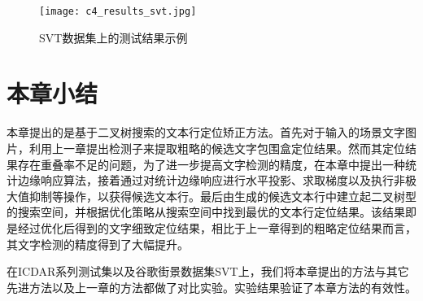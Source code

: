         \begin{figure}[!h]
        \centering
        \texttt{[image: c4\_results\_svt.jpg]}
        \caption{SVT数据集上的测试结果示例}
        \label{fig.c4_results_svt}
        \end{figure}


    \section{本章小结}

    本章提出的是基于二叉树搜索的文本行定位矫正方法。首先对于输入的场景文字图片，利用上一章提出检测子来提取粗略的候选文字包围盒定位结果。然而其定位结果存在重叠率不足的问题，为了进一步提高文字检测的精度，在本章中提出一种统计边缘响应算法，接着通过对统计边缘响应进行水平投影、求取梯度以及执行非极大值抑制等操作，以获得候选文本行。最后由生成的候选文本行中建立起二叉树型的搜索空间，并根据优化策略从搜索空间中找到最优的文本行定位结果。该结果即是经过优化后得到的文字细致定位结果，相比于上一章得到的粗略定位结果而言，其文字检测的精度得到了大幅提升。

    在ICDAR系列测试集以及谷歌街景数据集SVT上，我们将本章提出的方法与其它先进方法以及上一章的方法都做了对比实验。实验结果验证了本章方法的有效性。


